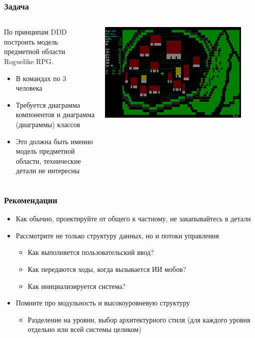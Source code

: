 \documentclass[xetex,mathserif,serif]{beamer}
\begin{document}
	\begin{frame}
		\frametitle{Задача}
		\begin{columns}
			\begin{column}{0.5\textwidth}
				По принципам DDD построить модель предметной области Roguelike RPG.

				\begin{itemize}
					\item В командах по 3 человека
					\item Требуется диаграмма компонентов и диаграмма (диаграммы) классов
					\item Это должна быть именно модель предметной области, технические детали не интересны
				\end{itemize}
			\end{column}
			\begin{column}{0.5\textwidth}
				\begin{center}
					\includegraphics[width=0.9\textwidth]{roguelike.png}
				\end{center}
			\end{column}
		\end{columns}
	\end{frame}

	\begin{frame}
		\frametitle{Рекомендации}
		\begin{itemize}
			\item Как обычно, проектируйте от общего к частному, не закапывайтесь в детали
			\item Рассмотрите не только структуру данных, но и потоки управления
			\begin{itemize}
				\item Как выполняется пользовательский ввод?
				\item Как передаются ходы, когда вызывается ИИ мобов?
				\item Как инициализируется система?
			\end{itemize}
			\item Помните про модульность и высокоуровневую структуру
			\begin{itemize}
				\item Разделение на уровни, выбор архитектурного стиля (для каждого уровня отдельно или всей системы целиком)
			\end{itemize}
		\end{itemize}
	\end{frame}
\end{document}
